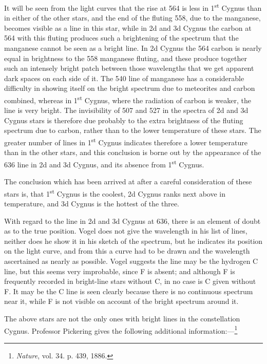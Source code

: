 \documentclass[a4paper, 12pt, oneside, polutonikogreek, english]{article}
\begin{document}
It will be seen from the light curves that the rise at 564 is less in 1\textsuperscript{st} Cygnus than in either of the other stars, and the end of the fluting 558, due to the manganese, becomes visible as a line in this star, while in 2d and 3d Cygnus the carbon at 564 with this fluting produces such a brightening of the spectrum that the manganese cannot be seen as a bright line. In 2d Cygnus the 564 carbon is nearly equal in brightness to the 558 manganese fluting, and these produce together such an intensely bright patch between those wavelengths that we get apparent dark spaces on each side of it. The 540 line of manganese has a considerable difficulty in showing itself on the bright spectrum due to meteorites and carbon combined, whereas in 1\textsuperscript{st} Cygnus, where the radiation of carbon is weaker, the line is very bright. The invisibility of 507 and 527 in the spectra of 2d and 3d Cygnus stars is therefore due probably to the extra brightness of the fluting spectrum due to carbon, rather than to the lower temperature of these stars. The greater number of lines in 1\textsuperscript{st} Cygnus indicates therefore a lower temperature than in the other stars, and this conclusion is borne out by the appearance of the 636 line in 2d and 3d Cygnus, and its absence from 1\textsuperscript{st} Cygnus.

The conclusion which has been arrived at after a careful consideration of these stars is, that 1\textsuperscript{st} Cygnus is the coolest, 2d Cygnus ranks next above in temperature, and 3d Cygnus is the hottest of the three.

With regard to the line in 2d and 3d Cygnus at 636, there is an element of doubt as to the true position. Vogel does not give the wavelength in his list of lines, neither does he show it in his sketch of the spectrum, but he indicates its position on the light curve, and from this a curve had to be drawn and the wavelength ascertained as nearly as possible. Vogel suggests the line may be the hydrogen C line, but this seems very improbable, since F is absent; and although F is frequently recorded in bright-line stars without C, in no case is C given without F. It may be the C line is seen clearly because there is no continuous spectrum near it, while F is not visible on account of the bright spectrum around it.

The above stars are not the only ones with bright lines in the constellation Cygnus. Professor Pickering gives the following additional information:---\footnote{\emph{Nature}, vol. 34. p. 439, 1886.}
\end{document}
